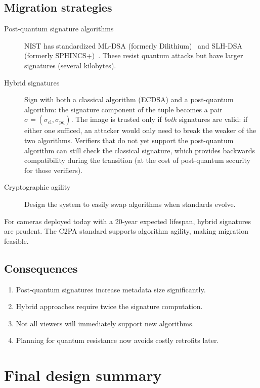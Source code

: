 \subsection{Migration strategies}

\begin{description}
  \item[Post-quantum signature algorithms] NIST has standardized
    ML-DSA (formerly Dilithium)~\autocite{FIPS204} and SLH-DSA (formerly
    SPHINCS+)~\autocite{FIPS205}.
    These resist quantum attacks but have larger signatures (several
    kilobytes).
  \item[Hybrid signatures] Sign with both a classical algorithm (ECDSA) and a
    post-quantum algorithm: the signature component of the tuple becomes a
    pair \(\sigma = (\sigma_{\text{cl}}, \sigma_{\text{pq}})\).
    The image is trusted only if \emph{both} signatures are valid: if either
    one sufficed, an attacker would only need to break the weaker of the two
    algorithms.
    Verifiers that do not yet support the post-quantum algorithm can still
    check the classical signature, which provides backwards compatibility
    during the transition (at the cost of post-quantum security for those
    verifiers).
  \item[Cryptographic agility] Design the system to easily swap algorithms 
    when standards evolve.
\end{description}

For cameras deployed today with a 20-year expected lifespan, hybrid signatures 
are prudent.
The C2PA standard supports algorithm agility, making migration feasible.

\subsection{Consequences}

\begin{enumerate}
  \item Post-quantum signatures increase metadata size significantly.
  \item Hybrid approaches require twice the signature computation.
  \item Not all viewers will immediately support new algorithms.
  \item Planning for quantum resistance now avoids costly retrofits later.
\end{enumerate}


\section{Final design summary}

